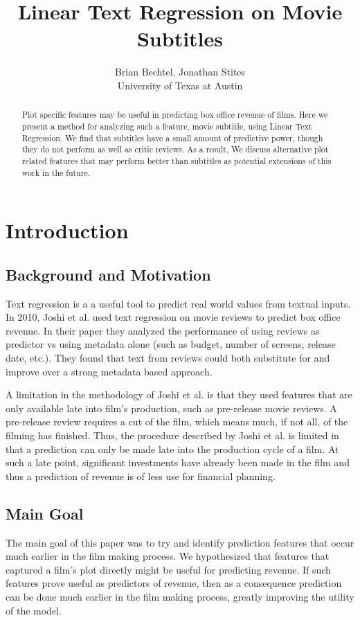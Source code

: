 \documentclass[11pt]{article}
\begin{document}
\title{Linear Text Regression on Movie Subtitles}
\author{Brian Bechtel, Jonathan Stites\\
       University of Texas at Austin}
\date{}

\maketitle

\begin{abstract}
\noindent
Plot specific features may be useful in predicting box office revenue of films.
Here we present a method for analyzing such a feature, movie subtitle, using Linear Text Regression. We find that subtitles have a small amount of predictive power, though they
do not perform as well as critic reviews. As a result, We discuss alternative plot related
features that may perform better than subtitles as potential extensions of this work in the
future.
\end{abstract}

\section{Introduction}
\subsection{Background and Motivation}
Text regression is a a useful tool to predict real world values from textual inputs.
In 2010, Joshi et al. used text regression on movie reviews to predict box office revenue.
In their paper they analyzed the performance of using reviews as predictor vs using metadata 
alone (such as budget, number of screens, release date, etc.). They found that text
from reviews could both substitute for and improve over a strong metadata based approach.

A limitation in the methodology of Joshi et al. is that they used features that are only
available late into film's production, such as pre-release movie reviews. A pre-release
review requires a cut of the film, which means much, if not all, of the filming has
finished. Thus, the procedure described by Joshi et al. is limited in that a prediction
can only be made late into the production cycle of a film. At such a late point,
significant investments have already been made in the film and thus a prediction of
revenue is of less use for financial planning.

\subsection{Main Goal}
The main goal of this paper was to try and identify prediction features that occur much
earlier in the film making process. We hypothesized that features that captured a film's
plot directly might be useful for predicting revenue. If such features prove useful as
predictors of revenue, then as a consequence prediction can be done much earlier in the
film making process, greatly improving the utility of the model.
\end{document}

